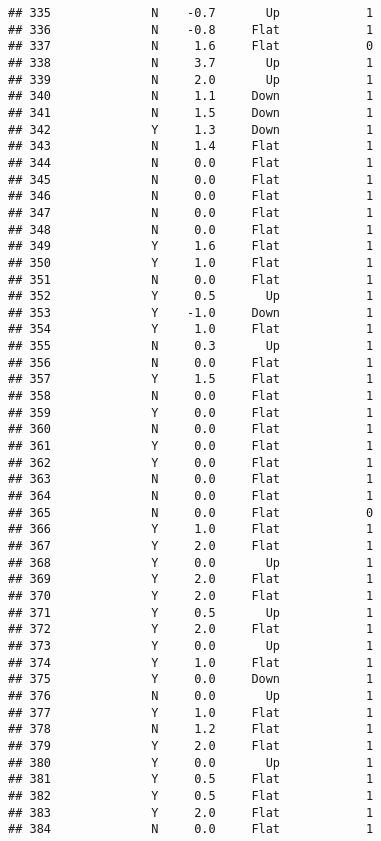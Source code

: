 \documentclass[
]{article}
\begin{document}
\begin{verbatim}
## 335              N    -0.7       Up            1
## 336              N    -0.8     Flat            1
## 337              N     1.6     Flat            0
## 338              N     3.7       Up            1
## 339              N     2.0       Up            1
## 340              N     1.1     Down            1
## 341              N     1.5     Down            1
## 342              Y     1.3     Down            1
## 343              N     1.4     Flat            1
## 344              N     0.0     Flat            1
## 345              N     0.0     Flat            1
## 346              N     0.0     Flat            1
## 347              N     0.0     Flat            1
## 348              N     0.0     Flat            1
## 349              Y     1.6     Flat            1
## 350              Y     1.0     Flat            1
## 351              N     0.0     Flat            1
## 352              Y     0.5       Up            1
## 353              Y    -1.0     Down            1
## 354              Y     1.0     Flat            1
## 355              N     0.3       Up            1
## 356              N     0.0     Flat            1
## 357              Y     1.5     Flat            1
## 358              N     0.0     Flat            1
## 359              Y     0.0     Flat            1
## 360              N     0.0     Flat            1
## 361              Y     0.0     Flat            1
## 362              Y     0.0     Flat            1
## 363              N     0.0     Flat            1
## 364              N     0.0     Flat            1
## 365              N     0.0     Flat            0
## 366              Y     1.0     Flat            1
## 367              Y     2.0     Flat            1
## 368              Y     0.0       Up            1
## 369              Y     2.0     Flat            1
## 370              Y     2.0     Flat            1
## 371              Y     0.5       Up            1
## 372              Y     2.0     Flat            1
## 373              Y     0.0       Up            1
## 374              Y     1.0     Flat            1
## 375              Y     0.0     Down            1
## 376              N     0.0       Up            1
## 377              Y     1.0     Flat            1
## 378              N     1.2     Flat            1
## 379              Y     2.0     Flat            1
## 380              Y     0.0       Up            1
## 381              Y     0.5     Flat            1
## 382              Y     0.5     Flat            1
## 383              Y     2.0     Flat            1
## 384              N     0.0     Flat            1

\end{verbatim}
\end{document}
